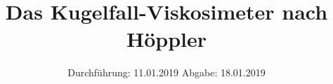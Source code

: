 

\subject{V204}
\title{Das Kugelfall-Viskosimeter nach Höppler}
\date{
  Durchführung: 11.01.2019
  \hspace{3em}
  Abgabe: 18.01.2019
}



\maketitle
\thispagestyle{empty}
\tableofcontents
\newpage



%
 
 


\printbibliography{}

